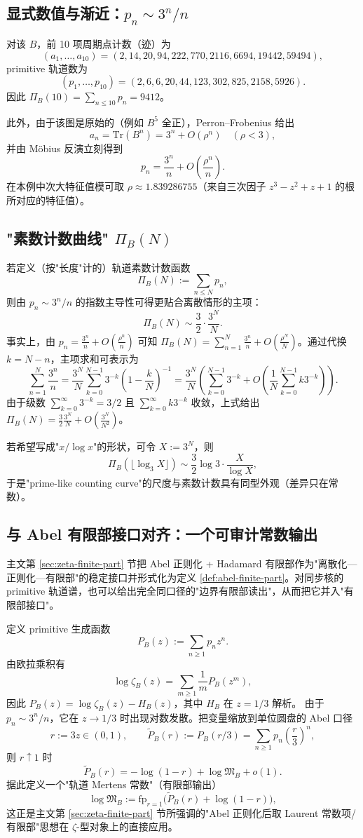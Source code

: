 \subsection{显式数值与渐近：\texorpdfstring{$p_n\sim 3^n/n$}{p\_n ~ 3**n/n}}
对该 $B$，前 10 项周期点计数（迹）为
\[
(a_1,\dots,a_{10})=(2,14,20,94,222,770,2116,6694,19442,59494),
\]
primitive 轨道数为
\[
(p_1,\dots,p_{10})=(2,6,6,20,44,123,302,825,2158,5926).
\]
因此 $\Pi_B(10)=\sum_{n\le 10}p_n=9412$。

此外，由于该图是原始的（例如 $B^5$ 全正），Perron--Frobenius 给出
\[
a_n=\mathrm{Tr}(B^n)=3^n+O(\rho^n)
\quad(\rho<3),
\]
并由 Möbius 反演立刻得到
\[
p_n=\frac{3^n}{n}+O\!\left(\frac{\rho^n}{n}\right).
\]
在本例中次大特征值模可取 $\rho\approx 1.839286755$（来自三次因子 $z^3-z^2+z+1$ 的根所对应的特征值）。

\subsection{"素数计数曲线" \texorpdfstring{$\Pi_B(N)$}{Pi\_B(N)}}
若定义（按"长度"计的）轨道素数计数函数
\[
\Pi_B(N):=\sum_{n\le N}p_n,
\]
则由 $p_n\sim 3^n/n$ 的指数主导性可得更贴合离散情形的主项：
\[
\Pi_B(N)\sim \frac{3}{2}\cdot \frac{3^N}{N}.
\]
事实上，由 $p_n = \frac{3^n}{n} + O(\frac{\rho^n}{n})$ 可知 $\Pi_B(N) = \sum_{n=1}^N \frac{3^n}{n} + O(\frac{\rho^N}{N})$。通过代换 $k = N - n$，主项求和可表示为
\[
\sum_{n=1}^N \frac{3^n}{n} = \frac{3^N}{N} \sum_{k=0}^{N-1} 3^{-k} \left( 1 - \frac{k}{N} \right)^{-1} = \frac{3^N}{N} \left( \sum_{k=0}^{N-1} 3^{-k} + O\left(\frac{1}{N}\sum_{k=0}^{N-1} k 3^{-k}\right) \right).
\]
由于级数 $\sum_{k=0}^\infty 3^{-k} = 3/2$ 且 $\sum_{k=0}^\infty k 3^{-k}$ 收敛，上式给出 $\Pi_B(N) = \frac{3}{2} \frac{3^N}{N} + O\left(\frac{3^N}{N^2}\right)$。

若希望写成"$x/\log x$"的形状，可令 $X:=3^N$，则
\[
\Pi_B(\lfloor \log_3 X\rfloor)\sim \frac{3}{2}\log 3\cdot \frac{X}{\log X},
\]
于是"prime-like counting curve"的尺度与素数计数具有同型外观（差异只在常数）。

\subsection{与 Abel 有限部接口对齐：一个可审计常数输出}
主文第 \ref{sec:zeta-finite-part} 节把 Abel 正则化 + Hadamard 有限部作为"离散化—正则化—有限部"的稳定接口并形式化为定义 \ref{def:abel-finite-part}。对同步核的 primitive 轨道谱，也可以给出完全同口径的"边界有限部读出"，从而把它并入"有限部接口"。

定义 primitive 生成函数
\[
P_B(z):=\sum_{n\ge 1}p_n z^n.
\]
由欧拉乘积有
\[
\log\zeta_B(z)=\sum_{m\ge 1}\frac{1}{m}P_B(z^m),
\]
因此 $P_B(z)=\log\zeta_B(z)-H_B(z)$，其中 $H_B$ 在 $z=1/3$ 解析。
由于 $p_n\sim 3^n/n$，它在 $z\to 1/3$ 时出现对数发散。把变量缩放到单位圆盘的 Abel 口径
\[
r:=3z\in(0,1),\qquad
\widetilde P_B(r):=P_B(r/3)=\sum_{n\ge 1}p_n\left(\frac{r}{3}\right)^n,
\]
则 $r\uparrow 1$ 时
\[
\widetilde P_B(r)= -\log(1-r)+\log\mathfrak{M}_B+o(1).
\]
据此定义一个"轨道 Mertens 常数"（有限部输出）
\[
\log\mathfrak{M}_B
:=\mathrm{fp}_{r=1}\bigl(\widetilde P_B(r)+\log(1-r)\bigr),
\]
这正是主文第 \ref{sec:zeta-finite-part} 节所强调的"Abel 正则化后取 Laurent 常数项/有限部"思想在 $\zeta$-型对象上的直接应用。

